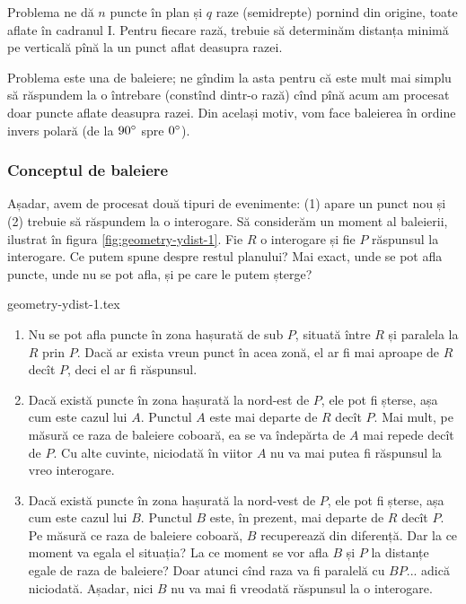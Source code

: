 \documentclass[../main.tex]{subfiles}
\begin{document}
Problema ne dă $n$ puncte în plan și $q$ raze (semidrepte) pornind din origine, toate aflate în cadranul I. Pentru fiecare rază, trebuie să determinăm distanța minimă pe verticală pînă la un punct aflat deasupra razei.

Problema este una de baleiere; ne gîndim la asta pentru că este mult mai simplu să răspundem la o întrebare (constînd dintr-o rază) cînd pînă acum am procesat doar puncte aflate deasupra razei. Din același motiv, vom face baleierea în ordine invers polară (de la $90\degree$ spre $0\degree$).

\subsubsection*{Conceptul de baleiere}

Așadar, avem de procesat două tipuri de evenimente: (1) apare un punct nou și (2) trebuie să răspundem la o interogare. Să considerăm un moment al baleierii, ilustrat în figura \ref{fig:geometry-ydist-1}. Fie $R$ o interogare și fie $P$ răspunsul la interogare. Ce putem spune despre restul planului? Mai exact, unde se pot afla puncte, unde nu se pot afla, și pe care le putem șterge?

{geometry-ydist-1.tex}

\begin{enumerate}
  \item Nu se pot afla puncte în zona hașurată de sub $P$, situată între $R$ și paralela la $R$ prin $P$. Dacă ar exista vreun punct în acea zonă, el ar fi mai aproape de $R$ decît $P$, deci el ar fi răspunsul.

  \item Dacă există puncte în zona hașurată la nord-est de $P$, ele pot fi șterse, așa cum este cazul lui $A$. Punctul $A$ este mai departe de $R$ decît $P$. Mai mult, pe măsură ce raza de baleiere coboară, ea se va îndepărta de $A$ mai repede decît de $P$. Cu alte cuvinte, niciodată în viitor $A$ nu va mai putea fi răspunsul la vreo interogare.

  \item Dacă există puncte în zona hașurată la nord-vest de $P$, ele pot fi șterse, așa cum este cazul lui $B$. Punctul $B$ este, în prezent, mai departe de $R$ decît $P$. Pe măsură ce raza de baleiere coboară, $B$ recuperează din diferență. Dar la ce moment va egala el situația? La ce moment se vor afla $B$ și $P$ la distanțe egale de raza de baleiere? Doar atunci cînd raza va fi paralelă cu $BP$... adică niciodată. Așadar, nici $B$ nu va mai fi vreodată răspunsul la o interogare.
\end{enumerate}
\end{document}
